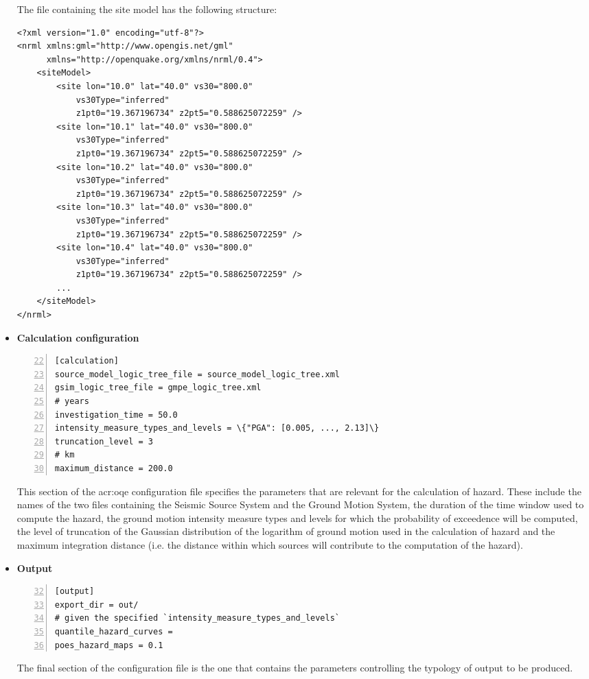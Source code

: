 \begin{itemize}
The file containing the site model has the following structure:
\begin{Verbatim}[frame=single, commandchars=\\\{\}, fontsize=\small]
<?xml version="1.0" encoding="utf-8"?>
<nrml xmlns:gml="http://www.opengis.net/gml"
      xmlns="http://openquake.org/xmlns/nrml/0.4">
    <siteModel>
        <site lon="10.0" lat="40.0" vs30="800.0" 
            vs30Type="inferred" 
            z1pt0="19.367196734" z2pt5="0.588625072259" />
        <site lon="10.1" lat="40.0" vs30="800.0" 
            vs30Type="inferred" 
            z1pt0="19.367196734" z2pt5="0.588625072259" />
        <site lon="10.2" lat="40.0" vs30="800.0" 
            vs30Type="inferred" 
            z1pt0="19.367196734" z2pt5="0.588625072259" />
        <site lon="10.3" lat="40.0" vs30="800.0" 
            vs30Type="inferred" 
            z1pt0="19.367196734" z2pt5="0.588625072259" />
        <site lon="10.4" lat="40.0" vs30="800.0" 
            vs30Type="inferred" 
            z1pt0="19.367196734" z2pt5="0.588625072259" />
        ...
    </siteModel>
</nrml>
\end{Verbatim}

%
\item \textbf{Calculation configuration}
\label{sec:calculation_configuration}
\begin{Verbatim}[frame=single, commandchars=\\\{\}, fontsize=\small,
     firstnumber=22, numbers=left, numbersep=2pt]
[calculation]
source_model_logic_tree_file = source_model_logic_tree.xml
gsim_logic_tree_file = gmpe_logic_tree.xml
# years
investigation_time = 50.0
intensity_measure_types_and_levels = \{"PGA": [0.005, ..., 2.13]\} 
truncation_level = 3
# km
maximum_distance = 200.0
\end{Verbatim}
This section of the \gls{acr:oqe} configuration file specifies the 
parameters that
are relevant for the calculation of hazard. These include the names of
the two files containing the Seismic Source System and the Ground 
Motion System, the duration of the time window used to compute the 
hazard, the ground motion intensity measure types and levels for 
which the probability of exceedence will be computed, the level of
truncation of the Gaussian 
distribution of the logarithm of ground motion used in the calculation 
of hazard and the maximum integration distance (i.e. the distance within 
which sources will contribute to the computation of the hazard).
%
\item \textbf{Output}
\begin{Verbatim}[frame=single, commandchars=\\\{\}, fontsize=\small,
    firstnumber=32, numbers=left, numbersep=2pt]
[output]
export_dir = out/
# given the specified `intensity_measure_types_and_levels`
quantile_hazard_curves =
poes_hazard_maps = 0.1
\end{Verbatim}
The final section of the configuration file is the one that contains 
the parameters controlling the typology of output to be produced.
%
\end{itemize}
%
%
%
